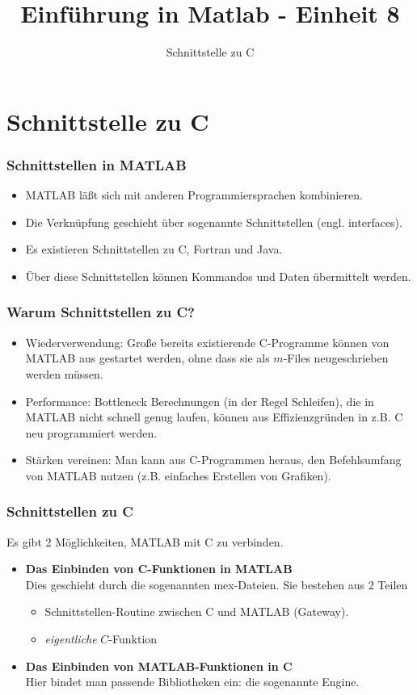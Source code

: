 \documentclass[hyperref={xetex}]{beamer}
\title{Einführung in Matlab - Einheit 8}
\subtitle{Schnittstelle zu C}
\begin{document}
\titlepage

\section{Schnittstelle zu C}
%
%
\begin{frame}[fragile]\frametitle{Schnittstellen in MATLAB}
\begin{itemize}
\item MATLAB l\"a{\ss}t sich mit anderen Programmiersprachen kombinieren. 
\item Die Verkn\"upfung geschieht \"uber sogenannte \alert{Schnittstellen} (engl. interfaces). 
\item Es existieren Schnittstellen zu C, Fortran und Java.
\item \"Uber diese Schnittstellen können Kommandos und Daten \"ubermittelt werden.
\end{itemize}
\end{frame}
%
%
\begin{frame}[fragile]\frametitle{Warum Schnittstellen zu C?}
\begin{itemize}
\item \alert{Wiederverwendung}: Gro{\ss}e bereits existierende C-Programme k\"onnen von MATLAB aus
  gestartet werden, ohne dass sie als $m$-Files neugeschrieben werden
  m\"ussen. 
\item \alert{Performance}: Bottleneck Berechnungen (in der Regel Schleifen), die in MATLAB nicht
  schnell genug laufen, k\"onnen aus Effizienzgr\"unden in z.B. C neu programmiert
  werden. 
\item \alert{Stärken vereinen}: Man kann aus C-Programmen heraus, den Befehlsumfang von MATLAB nutzen (z.B. einfaches Erstellen von Grafiken).
\end{itemize}
\end{frame}

%
%
\begin{frame}[fragile]\frametitle{Schnittstellen zu C}
Es gibt 2 M\"oglichkeiten, MATLAB mit C zu verbinden. 
\begin{itemize}
\item \textbf{Das Einbinden von C-Funktionen in MATLAB}\\ Dies geschieht durch die sogenannten
      \alert{mex-Dateien}. Sie bestehen aus 2 Teilen 
\begin{itemize}
\item  Schnittstellen-Routine zwischen C und MATLAB (Gateway).
\item \textit{eigentliche} $C$-Funktion
\end{itemize}

\item \textbf{Das Einbinden von MATLAB-Funktionen in C}\\ Hier bindet
      man passende Bibliotheken ein: die sogenannte \alert{Engine}.
\end{itemize}
\end{frame}
%
%
\end{document}
